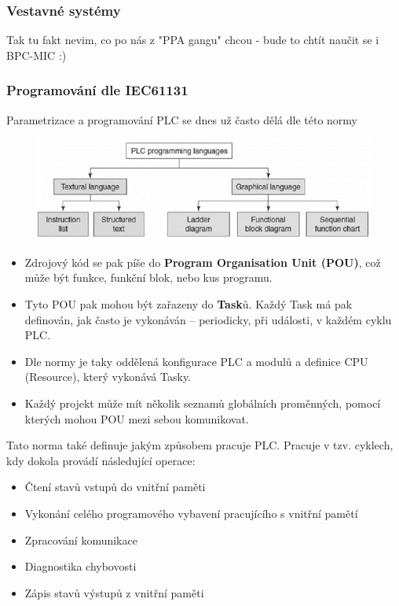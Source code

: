 \subsubsection*{Vestavné systémy}
Tak tu fakt nevim, co po nás z "PPA gangu" chcou - bude to chtít naučit se i BPC-MIC :)

\subsubsection*{Programování dle IEC61131}
Parametrizace a programování PLC se dnes už často dělá dle této normy

\begin{figure}[h]
    \begin{center}
        \includegraphics[scale = 1]{img/Picture14.png}
    \end{center}
\end{figure}

\begin{itemize}
    \item Zdrojový kód se pak píše do \textbf{Program Organisation Unit (POU)}, což může být funkce, funkční blok, nebo kus programu.
    \item Tyto POU pak mohou být zařazeny do \textbf{Task}ů. Každý Task má pak definován, jak často je vykonáván – periodicky, při události, v každém cyklu PLC.
    \item Dle normy je taky oddělená konfigurace PLC a modulů a definice CPU (Resource), který vykonává Tasky.
    \item Každý projekt může mít několik seznamů globálních proměnných, pomocí kterých mohou POU mezi sebou komunikovat.
\end{itemize}

Tato norma také definuje jakým způsobem pracuje PLC. Pracuje v tzv. cyklech, kdy dokola provádí následující operace:
\begin{itemize}
    \item Čtení stavů vstupů do vnitřní paměti
    \item Vykonání celého programového vybavení pracujícího s vnitřní pamětí
    \item Zpracování komunikace
    \item Diagnostika chybovosti
    \item Zápis stavů výstupů z vnitřní paměti
\end{itemize}

